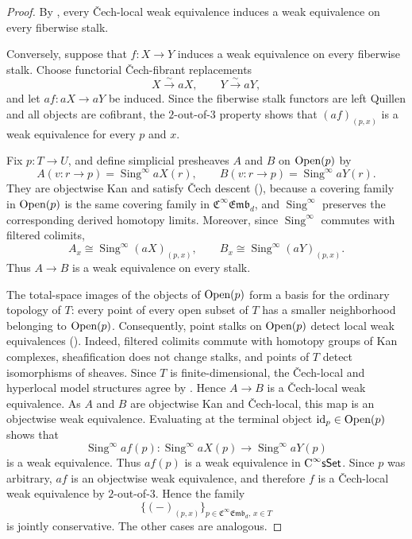 \documentclass{amsart}
\newcommand{\cat}[1]{\mathsf{#1}}
\newcommand{\sset}{\cat{sSet}}
\newcommand{\id}{\mathrm{id}}
\newcommand{\Open}{\textnormal{Open}}
\DeclareMathOperator{\Sing}{Sing}
\newcommand{\CsSet}{\textnormal{C}^{\infty}\sset}
\newcommand{\femb}[1]{\mathfrak{C}^{\infty}\mathfrak{Emb}_{#1}}
\theoremstyle{definition}
\numberwithin{equation}{subsection}
\numberwithin{subsubsection}{subsection}
\begin{document}
\begin{proof}
  By , every \v{C}ech-local weak
  equivalence induces a weak equivalence on every fiberwise stalk.

  Conversely, suppose that \(f:X\to Y\) induces a weak equivalence on every
  fiberwise stalk. Choose functorial \v{C}ech-fibrant replacements
  \[
    X\xrightarrow{\sim}aX,
    \qquad
    Y\xrightarrow{\sim}aY,
  \]
  and let \(af:aX\to aY\) be induced. Since the fiberwise stalk functors are
  left
  Quillen and all objects are cofibrant, the \(2\)-out-of-\(3\) property shows
  that \((af)_{(p,x)}\) is a weak equivalence for every \(p\) and \(x\).

  Fix \(p:T\to U\), and define simplicial presheaves \(A\) and \(B\) on
  \(\Open(p)\) by
  \[
    A(v:r\to p)=\Sing^\infty aX(r),
    \qquad
    B(v:r\to p)=\Sing^\infty aY(r).
  \]
  They are objectwise Kan and satisfy \v{C}ech descent
  (), because a covering family
  in \(\Open(p)\) is the same covering family in \(\femb{d}\), and
  \(\Sing^\infty\) preserves the corresponding derived homotopy limits.
  Moreover, since \(\Sing^\infty\) commutes with filtered colimits,
  \[
    A_x\cong\Sing^\infty(aX)_{(p,x)},
    \qquad
    B_x\cong\Sing^\infty(aY)_{(p,x)}.
  \]
  Thus \(A\to B\) is a weak equivalence on every stalk.

  The total-space images of the objects of \(\Open(p)\) form a basis for
  the ordinary topology of \(T\): every point of every open subset of \(T\)
  has a smaller neighborhood belonging to \(\Open(p)\).
  Consequently, point stalks on \(\Open(p)\) detect local weak equivalences
  ().
  Indeed, filtered colimits commute with homotopy groups of Kan complexes,
  sheafification does not change stalks, and points of \(T\) detect
  isomorphisms of sheaves. Since \(T\) is finite-dimensional, the
  \v{C}ech-local and hyperlocal model structures agree by
  \cite[Theorems~5.8--5.9]{GM26}. Hence \(A\to B\) is a \v{C}ech-local weak
  equivalence. As \(A\) and \(B\) are objectwise Kan and \v{C}ech-local, this
  map is an objectwise weak equivalence. Evaluating at the terminal object
  \(\id_p\in\Open(p)\) shows that
  \[
    \Sing^\infty af(p):\Sing^\infty aX(p)\longrightarrow
    \Sing^\infty aY(p)
  \]
  is a weak equivalence. Thus \(af(p)\) is a weak equivalence in \(\CsSet\).
  Since \(p\) was arbitrary, \(af\) is an objectwise weak equivalence, and
  therefore \(f\) is
  a \v{C}ech-local weak equivalence by \(2\)-out-of-\(3\). Hence the family
  \[
    \bigl\{(-)_{(p,x)}\bigr\}_{p\in\femb{d},\,x\in T}
  \]
  is jointly conservative. The other cases are analogous.
\end{proof}
\end{document}
